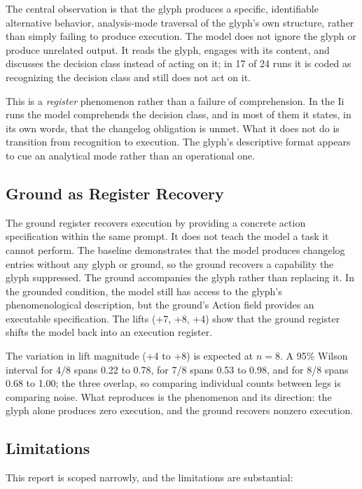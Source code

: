 \documentclass[11pt,a4paper]{article}
\begin{document}
The central observation is that the glyph produces a specific, identifiable
alternative behavior, analysis-mode traversal of the glyph's own structure,
rather than simply failing to produce execution. The model does not
ignore the glyph or produce unrelated output. It reads the
glyph, engages with its content, and discusses the decision class instead of
acting on it; in 17 of 24 runs it is coded as recognizing the decision class and still
does not act on it.

This is a \emph{register} phenomenon rather than a failure of comprehension. In
the Ii runs the model comprehends the decision class, and in most of them it
states, in its own words, that the changelog obligation is unmet. What it does not do is transition from
recognition to execution. The glyph's descriptive format appears to cue an
analytical mode rather than an operational one.

\subsection{Ground as Register Recovery}\label{sec:ground}

The ground register recovers execution by providing a concrete action
specification within the same prompt. It does not teach the model a task
it cannot perform. The baseline demonstrates that the model produces
changelog entries without any glyph or ground, so the ground recovers a
capability the glyph suppressed. The ground accompanies the glyph rather
than replacing it. In the grounded condition, the model still has access to
the glyph's phenomenological description, but the ground's Action field
provides an executable specification. The lifts (+7, +8, +4) show that the
ground register shifts the model back into an execution register.

The variation in lift magnitude (+4 to +8) is expected at $n = 8$. A 95\%
Wilson interval for 4/8 spans 0.22 to 0.78, for 7/8 spans
0.53 to 0.98, and for 8/8 spans 0.68 to 1.00; the three
overlap, so comparing individual counts between legs is comparing noise. What
reproduces is the phenomenon and its direction: the glyph alone produces zero
execution, and the ground recovers nonzero execution.

\subsection{Limitations}\label{sec:limitations}

This report is scoped narrowly, and the limitations are substantial:
\end{document}
